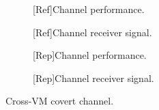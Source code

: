 \begin{figure}[t]
    \centering
    \begin{subfigure}[b]{.24\linewidth}
        \centering
        \caption{\label{fig:9b:ref:covert-vm-summary}[Ref]Channel performance.}
    \end{subfigure}
    \hfill
    \begin{subfigure}[b]{.24\linewidth}
        \centering
        \caption{\label{fig:9c:ref:covert-vm-signal}[Ref]Channel receiver signal.}
    \end{subfigure}
    \hfill
    \begin{subfigure}[b]{.24\linewidth}
        \centering
        \caption{\label{fig:9b:rep:covert-vm-summary}[Rep]Channel performance.}
    \end{subfigure}
    \hfill
    \begin{subfigure}[b]{.24\linewidth}
        \centering
        \caption{\label{fig:9c:rep:covert-vm-signal}[Rep]Channel receiver signal.}
    \end{subfigure}

    \caption{\label{fig:5:cross-vm-covert}Cross-VM covert channel.}
\end{figure}
